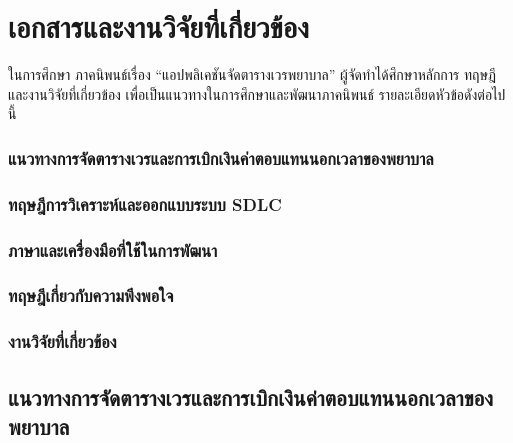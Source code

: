 
\baselineskip=8mm
\chapter{เอกสารและงานวิจัยที่เกี่ยวข้อง}

\renewcommand{\thesubsection}{\arabic{subsection}.}
\renewcommand{\theequation}{\thesection.\arabic{equation}}
\renewcommand{\thesection}{}
\renewcommand{\thesubsubsection}{\thesubsection\arabic{subsubsection}.}



ในการศึกษา ภาคนิพนธ์เรื่อง “แอปพลิเคชันจัดตารางเวรพยาบาล” ผู้จัดทำได้ศึกษาหลักการ ทฤษฎี และงานวิจัยที่เกี่ยวข้อง เพื่อเป็นแนวทางในการศึกษาและพัฒนาภาคนิพนธ์ รายละเอียดหัวข้อดังต่อไปนี้

\hspace{0cm}\subsection{แนวทางการจัดตารางเวรและการเบิกเงินค่าตอบแทนนอกเวลาของพยาบาล}

\hspace{0cm}\subsection{ทฤษฎีการวิเคราะห์และออกแบบระบบ SDLC}

\hspace{0cm}\subsection{ภาษาและเครื่องมือที่ใช้ในการพัฒนา}

\hspace{0cm}\subsection{ทฤษฎีเกี่ยวกับความพึงพอใจ}

\hspace{0cm}\subsection{งานวิจัยที่เกี่ยวข้อง}

\clearpage

\renewcommand{\thesubsection}{}

\section{แนวทางการจัดตารางเวรและการเบิกเงินค่าตอบแทนนอกเวลาของพยาบาล}

